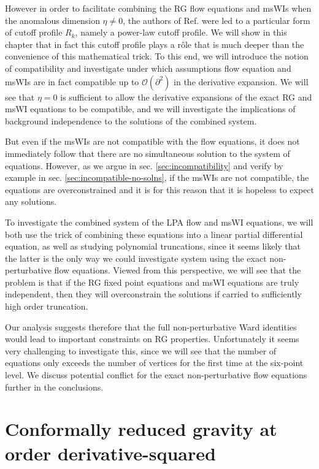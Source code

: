 \documentclass[11pt]{book}
\numberwithin{equation}{chapter}
\begin{document}
However in order to facilitate combining the RG flow equations and msWIs when the anomalous
dimension $\eta\ne0$, the authors of Ref. \cite{Dietz:2015owa} were led to a particular form
of cutoff profile $R_k$, namely a power-law cutoff profile.
We will show in this chapter that in fact this cutoff profile plays a r\^ole that is much
deeper than the convenience of this mathematical trick.
To this end, we will introduce the notion of compatibility and investigate under which
assumptions flow equation and msWIs are in fact compatible up to $\mathcal O(\partial^2)$
in the derivative expansion.
We will see that $\eta=0$ is sufficient to allow the derivative expansions of the exact RG and msWI equations
to be compatible, and we will investigate the implications of background independence to the solutions
of the combined system.

But even if the msWIs are not compatible with the flow equations,
it does not immediately follow that there are no simultaneous solution to the system of equations.
However, as we argue in sec. \ref{sec:incompatibility} and verify by example in
sec. \ref{sec:incompatible-no-solns},
if the msWIs are not compatible, the equations are overconstrained and it is for this reason that
it is hopeless to expect any solutions.

To investigate the combined system of the LPA flow and msWI equations,
we will both use the trick of combining these equations into a linear partial differential equation,
as well as studying polynomial truncations, since it seems likely that the latter is the only way we could
investigate system using the exact non-perturbative flow equations.
Viewed from this perspective, we will see that the problem is that if the RG fixed point equations
and msWI equations are truly independent, then they will overconstrain the solutions if
carried to sufficiently high order truncation.

Our analysis suggests therefore that the full non-perturbative Ward identities would lead
to important constraints on RG properties. Unfortunately it seems very challenging to investigate this,
since we will see that the number of equations only exceeds the number of vertices for the first time
at the six-point level.
We discuss potential conflict for the exact non-perturbative flow equations further in the conclusions.


\section{Conformally reduced gravity at order derivative-squared}
\label{sec:review}
\end{document}
